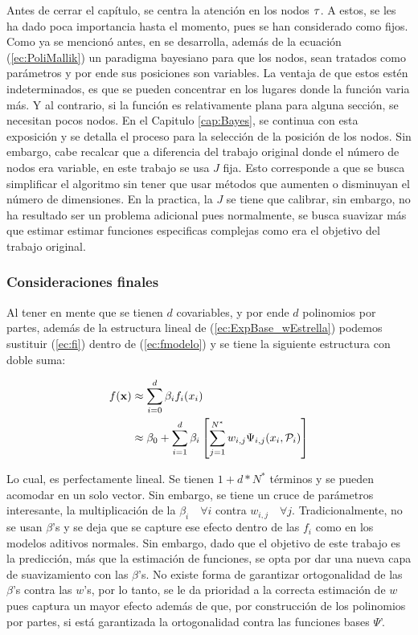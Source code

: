 \documentclass[../Main/Main.tex]{subfiles}
\begin{document}
Antes de cerrar el capítulo, se centra la atención en los nodos $\tau$. A estos, se les ha dado poca importancia hasta el momento, pues se han considerado como fijos. Como ya se mencionó antes, en \autocite{mallik1998automatic} se desarrolla, además de la ecuación (\ref{ec:PoliMallik}) un paradigma bayesiano para que los nodos, sean tratados como parámetros y por ende sus posiciones son variables. La ventaja de que estos estén indeterminados, es que se pueden concentrar en los lugares donde la función varia más. Y al contrario, si la función es relativamente plana para alguna sección, se necesitan pocos nodos. En el Capitulo \ref{cap:Bayes}, se continua con esta exposición y se detalla el proceso para la selección de la posición de los nodos. Sin embargo, cabe recalcar que a diferencia del trabajo original donde el número de nodos era variable, en este trabajo se usa $J$ fija. Esto corresponde a que se busca simplificar el algoritmo sin tener que usar métodos que aumenten o disminuyan el número de dimensiones. En la practica, la $J$ se tiene que calibrar, sin embargo, no ha resultado ser un problema adicional pues normalmente, se busca suavizar más que estimar estimar funciones especificas complejas como era el objetivo del trabajo original.

\subsubsection*{Consideraciones finales}

Al tener en mente que se tienen $d$ covariables, y por ende $d$ polinomios por partes, además de la estructura lineal de (\ref{ec:ExpBase_wEstrella}) podemos sustituir (\ref{ec:fi}) dentro de (\ref{ec:fmodelo}) y se tiene la siguiente estructura con doble suma:

\begin{align*}
	f(\mathbf{x}) &\approx \sum_{i=0}^d \beta_i f_i(x_i) \\
			&\approx \beta_0 + \sum_{i=1}^d \beta_i \left[\sum_{j=1}^{N^*} w_{i,j}\Psi_{i,j}(x_i, \mathcal{P}_i)\right]
\end{align*}

Lo cual, es perfectamente lineal. Se tienen $1 + d*N^*$ términos y se pueden acomodar en un solo vector. Sin embargo, se tiene un cruce de parámetros interesante, la multiplicación de la $\beta_i\quad \forall i$ contra $w_{i,j} \quad \forall j$. Tradicionalmente, no se usan $\beta$'s y se deja que se capture ese efecto dentro de las $f_i$ como en los modelos aditivos normales. Sin embargo, dado que el objetivo de este trabajo es la predicción, más que la estimación de funciones, se opta por dar una nueva capa de suavizamiento con las $\beta$'s. No existe forma de garantizar ortogonalidad de las $\beta$'s contra las $w$'s, por lo tanto, se le da prioridad a la correcta estimación de $w$ pues captura un mayor efecto además de que, por construcción de los polinomios por partes, si está garantizada la ortogonalidad contra las funciones bases $\Psi$'.
\end{document}
